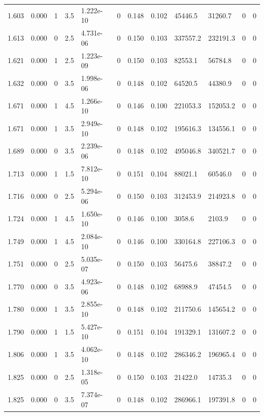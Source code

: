\documentclass[preview]{standalone}
\begin{document}
{{{{\begin{tabular}{L{1.2cm}C{1.2cm} C{0.3cm}C{0.5cm} C{1.4cm}C{1.4cm} C{1.4cm}C{1.4cm} C{1.6cm}C{1.6cm} C{1.6cm}C{1.6cm}}
  1.603  &  0.000  & 1     & 3.5 &  1.222e-10  & 0  &  0.148&   0.102& 45446.5 & 31260.7   &  0 & 0  \\ 
  1.613  &  0.000  & 0     & 2.5 &  4.731e-06  & 0  &  0.150&   0.103& 337557.2 & 232191.3   &  0 & 0  \\ 
  1.621  &  0.000  & 1     & 2.5 &  1.223e-09  & 0  &  0.150&   0.103& 82553.1 & 56784.8   &  0 & 0  \\ 
  1.632  &  0.000  & 0     & 3.5 &  1.998e-06  & 0  &  0.148&   0.102& 64520.5 & 44380.9   &  0 & 0  \\ 
  1.671  &  0.000  & 1     & 4.5 &  1.266e-10  & 0  &  0.146&   0.100& 221053.3 & 152053.2   &  0 & 0  \\ 
  1.671  &  0.000  & 1     & 3.5 &  2.949e-10  & 0  &  0.148&   0.102& 195616.3 & 134556.1   &  0 & 0  \\ 
  1.689  &  0.000  & 0     & 3.5 &  2.239e-06  & 0  &  0.148&   0.102& 495046.8 & 340521.7   &  0 & 0  \\ 
  1.713  &  0.000  & 1     & 1.5 &  7.812e-10  & 0  &  0.151&   0.104& 88021.1 & 60546.0   &  0 & 0  \\ 
  1.716  &  0.000  & 0     & 2.5 &  5.294e-06  & 0  &  0.150&   0.103& 312453.9 & 214923.8   &  0 & 0  \\ 
  1.724  &  0.000  & 1     & 4.5 &  1.650e-10  & 0  &  0.146&   0.100& 3058.6 & 2103.9   &  0 & 0  \\ 
  1.749  &  0.000  & 1     & 4.5 &  2.084e-10  & 0  &  0.146&   0.100& 330164.8 & 227106.3   &  0 & 0  \\ 
  1.751  &  0.000  & 0     & 2.5 &  5.035e-07  & 0  &  0.150&   0.103& 56475.6 & 38847.2   &  0 & 0  \\ 
  1.770  &  0.000  & 0     & 3.5 &  4.923e-06  & 0  &  0.148&   0.102& 68988.9 & 47454.5   &  0 & 0  \\ 
  1.780  &  0.000  & 1     & 3.5 &  2.855e-10  & 0  &  0.148&   0.102& 211750.6 & 145654.2   &  0 & 0  \\ 
  1.790  &  0.000  & 1     & 1.5 &  5.427e-10  & 0  &  0.151&   0.104& 191329.1 & 131607.2   &  0 & 0  \\ 
  1.806  &  0.000  & 1     & 3.5 &  4.062e-10  & 0  &  0.148&   0.102& 286346.2 & 196965.4   &  0 & 0  \\ 
  1.825  &  0.000  & 0     & 2.5 &  1.318e-05  & 0  &  0.150&   0.103& 21422.0 & 14735.3   &  0 & 0  \\ 
  1.825  &  0.000  & 0     & 3.5 &  7.374e-07  & 0  &  0.148&   0.102& 286966.1 & 197391.8   &  0 & 0  \\ 

\end{tabular}}}}}
\end{document}
